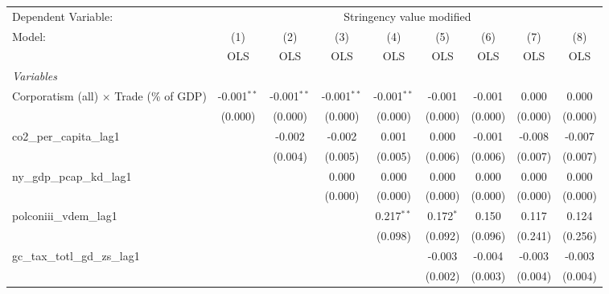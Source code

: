 
\begingroup
\centering
\begin{tabular}{lcccccccc}
   \toprule
   Dependent Variable: & \multicolumn{8}{c}{Stringency value modified}\\
   Model:                                         & (1)           & (2)           & (3)           & (4)           & (5)         & (6)     & (7)     & (8)\\  
                                                  &  OLS          & OLS           & OLS           & OLS           & OLS         & OLS     & OLS     & OLS\\  
   \midrule
   \emph{Variables}\\
   Corporatism (all) $\times$ Trade (\% of GDP)   & -0.001$^{**}$ & -0.001$^{**}$ & -0.001$^{**}$ & -0.001$^{**}$ & -0.001      & -0.001  & 0.000   & 0.000\\   
                                                  & (0.000)       & (0.000)       & (0.000)       & (0.000)       & (0.000)     & (0.000) & (0.000) & (0.000)\\   
   co2\_per\_capita\_lag1                         &               & -0.002        & -0.002        & 0.001         & 0.000       & -0.001  & -0.008  & -0.007\\   
                                                  &               & (0.004)       & (0.005)       & (0.005)       & (0.006)     & (0.006) & (0.007) & (0.007)\\   
   ny\_gdp\_pcap\_kd\_lag1                        &               &               & 0.000         & 0.000         & 0.000       & 0.000   & 0.000   & 0.000\\   
                                                  &               &               & (0.000)       & (0.000)       & (0.000)     & (0.000) & (0.000) & (0.000)\\   
   polconiii\_vdem\_lag1                          &               &               &               & 0.217$^{**}$  & 0.172$^{*}$ & 0.150   & 0.117   & 0.124\\   
                                                  &               &               &               & (0.098)       & (0.092)     & (0.096) & (0.241) & (0.256)\\   
   gc\_tax\_totl\_gd\_zs\_lag1                    &               &               &               &               & -0.003      & -0.004  & -0.003  & -0.003\\   
                                                  &               &               &               &               & (0.002)     & (0.003) & (0.004) & (0.004)\\   

\end{tabular}
